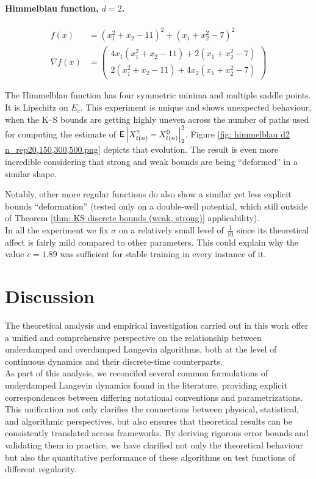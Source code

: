 \documentclass[12pt]{article}
\begin{document}
\paragraph{Himmelblau function, $d=2$.}
\begin{align*}
    f(x) &= (x_1^2 + x_2 - 11)^2 + (x_1 + x_2^2 - 7)^2\\
    \nabla f(x) &=
    \begin{pmatrix}
        4x_1(x_1^2 + x_2 - 11) + 2(x_1 + x_2^2 - 7) \\
        2(x_1^2 + x_2 - 11) + 4x_2(x_1 + x_2^2 - 7)
    \end{pmatrix}
\end{align*}

The Himmelblau function has four symmetric minima and multiple saddle points.
It is Lipschitz on $E_c$.
This experiment is unique and shows unexpected behaviour, when the K--S bounds are getting highly uneven across the number of paths used for computing the estimate of ${\mathsf E}\left|X_{t(n)}^\gamma - X_{t(n)}^0\right|_2^2$.
Figure \ref{fig: himmelblau d2 n_rep20,150,300,500.png} depicts that evolution.
The result is even more incredible considering that strong and weak bounds are being ``deformed'' in a similar shape.

Notably, other more regular functions do also show a similar yet less explicit bounds ``deformation'' (tested only on a double-well potential, which still outside of Theorem \ref{thm: KS discrete bounds (weak, strong)} applicability). \\

In all the experiment we fix $\sigma$ on a relatively small level of $\frac{1}{10}$ since its theoretical affect is fairly mild compared to other parameters.
This could explain why the value $c=1.89$ was sufficient for stable training in every instance of it.

\section{Discussion}

The theoretical analysis and empirical investigation carried out in this work offer a unified and comprehensive perspective on the relationship between underdamped and overdamped Langevin algorithms, both at the level of continuous dynamics and their discrete-time counterparts. \\

As part of this analysis, we reconciled several common formulations of underdamped Langevin dynamics found in the literature, providing explicit correspondences between differing notational conventions and parametrizations.
This unification not only clarifies the connections between physical, statistical, and algorithmic perspectives, but also ensures that theoretical results can be consistently translated across frameworks.
By deriving rigorous error bounds and validating them in practice, we have clarified not only the theoretical behaviour but also the quantitative performance of these algorithms on test functions of different regularity.\\
\end{document}
